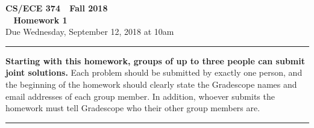 \documentclass[11pt]{article}
\begin{document}

\thispagestyle{empty}

\begin{center}
\Large\textbf{CS/ECE 374 \,\decosix\,  Fall 2018}%
\\
\LARGE\textbf{\decothreeleft~ Homework 1 ~\decothreeright}%
\\[0.5ex]
\large Due Wednesday, September 12, 2018 at 10am
\end{center}

\bigskip
\hrule
\bigskip

\noindent
\textbf{Starting with this homework, groups of up to three people can submit joint solutions.}  Each problem should be submitted by exactly one person, and the beginning of the homework should clearly state the Gradescope names and email addresses of each group member.  In addition, whoever submits the homework must tell Gradescope who their other group members are.
\bigskip
\hrule
\bigskip
\end{document}
